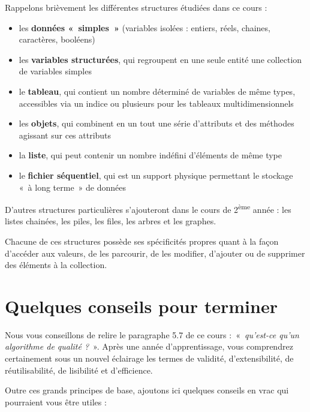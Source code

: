 Rappelons brièvement les différentes structures étudiées dans ce cours :

\liststyleListi
\begin{itemize}
	\item 
		les \textbf{données «~simples~»} (variables isolées : entiers, réels,
		chaines, caractères, booléens)
	\item 
		les \textbf{variables structurées}, qui regroupent en une seule entité
		une collection de variables simples
	\item 
		le \textbf{tableau}, qui contient un nombre déterminé de variables de
		même types, accessibles via un indice ou plusieurs pour les tableaux
		multidimensionnels
	\item 
		les \textbf{objets}, qui combinent en un tout une série d’attributs et
		des méthodes agissant sur ces attributs
	\item 
		la \textbf{liste}, qui peut contenir un nombre indéfini d’éléments de
		même type
	\item 
		le \textbf{fichier séquentiel}, qui est un support physique permettant
		le stockage «~à long terme~» de données
\end{itemize}

D’autres structures particulières s’ajouteront dans le cours de
2\textsuperscript{ème} année : les listes chainées, les piles, les
files, les arbres et les graphes.

Chacune de ces structures possède ses spécificités propres quant à la
façon d’accéder aux valeurs, de les parcourir, de les modifier,
d’ajouter ou de supprimer des éléments à la collection. 


\section{Quelques conseils pour terminer}

Nous vous conseillons de relire le paragraphe 5.7 de ce cours
:~«~\textit{qu’est-ce qu’un algorithme de qualité ?}~». Après une année
d’apprentissage, vous comprendrez certainement sous un nouvel éclairage
les termes de validité, d’extensibilité, de réutilisabilité, de
lisibilité et d’efficience.

Outre ces grands principes de base, ajoutons ici quelques conseils en
vrac qui pourraient vous être utiles :

